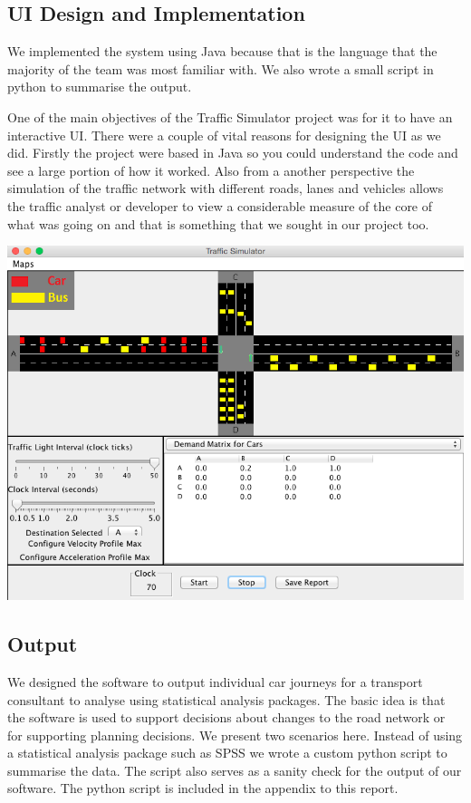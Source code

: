 \subsection{UI Design and Implementation}
We implemented the system using Java because that is the language that the majority of the team was most familiar with. We also wrote a small script in python to summarise the output.

One of the main objectives of the Traffic Simulator project was for it to have an interactive UI. There were a couple of vital reasons for designing the UI as we did. Firstly the project were based in Java so you could understand the code and see a large portion of how it worked. Also from a another perspective the simulation of the traffic network with different roads, lanes and vehicles allows the traffic analyst or developer to view a considerable measure of the core of what was going on and that is something that we sought in our project too.

\begin{center}
\includegraphics[scale=0.4]{./images/network1.png}
\end{center}


\subsection{Output}
We designed the software to output individual car journeys for a transport consultant to analyse using statistical analysis packages.  The basic idea is that the software is used to support decisions about  changes to the road network or for supporting planning decisions.  We present two scenarios here. Instead of using a statistical analysis package such as SPSS we wrote a custom python script to summarise the data.  The script also serves as a sanity check for the output of our software.  The python script is included in the appendix to this report. 



